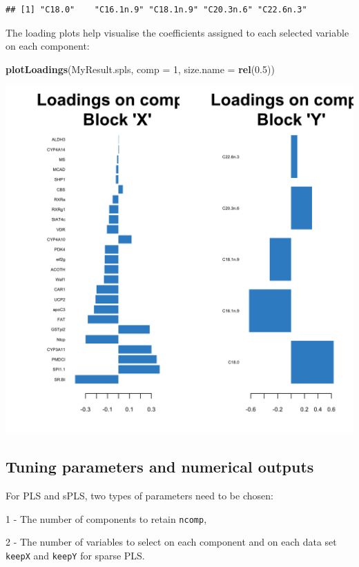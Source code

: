 \documentclass[]{book}
\newenvironment{Shaded}{\begin{snugshade}}{\end{snugshade}}
\newcommand{\DataTypeTok}[1]{\textcolor[rgb]{0.13,0.29,0.53}{#1}}
\newcommand{\DecValTok}[1]{\textcolor[rgb]{0.00,0.00,0.81}{#1}}
\newcommand{\FloatTok}[1]{\textcolor[rgb]{0.00,0.00,0.81}{#1}}
\newcommand{\KeywordTok}[1]{\textcolor[rgb]{0.13,0.29,0.53}{\textbf{#1}}}
\newcommand{\NormalTok}[1]{#1}
\begin{document}
\begin{verbatim}
## [1] "C18.0"    "C16.1n.9" "C18.1n.9" "C20.3n.6" "C22.6n.3"
\end{verbatim}

The loading plots help visualise the coefficients assigned to each selected variable on each component:

\begin{Shaded}
\begin{Highlighting}[]
\KeywordTok{plotLoadings}\NormalTok{(MyResult.spls, }\DataTypeTok{comp =} \DecValTok{1}\NormalTok{, }\DataTypeTok{size.name =} \KeywordTok{rel}\NormalTok{(}\FloatTok{0.5}\NormalTok{))}
\end{Highlighting}
\end{Shaded}

\begin{center}\includegraphics[width=0.75\linewidth,]{Figures/05-pls-plotLoadings-1-1} \end{center}

\hypertarget{tuning:PLS}{%
\subsection{Tuning parameters and numerical outputs}\label{tuning:PLS}}

For PLS and sPLS, two types of parameters need to be chosen:

1 - The number of components to retain \texttt{ncomp},

2 - The number of variables to select on each component and on each data set \texttt{keepX} and \texttt{keepY} for sparse PLS.
\end{document}
